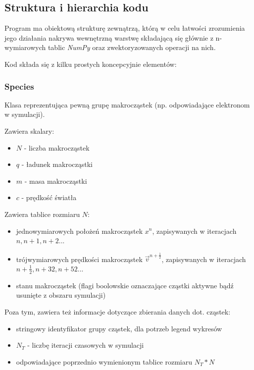 \subsection{Struktura i hierarchia kodu}

Program ma obiektową strukturę zewnątrzą, którą w celu łatwości zrozumienia jego działania nakrywa wewnętrzną warstwę
składającą się głównie z n-wymiarowych tablic \emph{NumPy} oraz zwektoryzowanych operacji na nich.

Kod składa się z kilku prostych koncepcyjnie elementów:

\subsubsection{Species}
Klasa reprezentująca pewną grupę makrocząstek (np. odpowiadające elektronom w symulacji).

Zawiera skalary:
\begin{itemize}
\item $N$ - liczba makrocząstek
\item $q$ - ładunek makrocząstki
\item $m$ - masa makrocząstki
\item $c$ - prędkość światła
\end{itemize}

Zawiera tablice rozmiaru $N$:
\begin{itemize}
\item jednowymiarowych położeń makrocząstek $x^n$, zapisywanych w iteracjach $n, n+1, n+2$...
\item trójwymiarowych prędkości makrocząstek $\vec{v}^{n+\frac{1}{2}}$, zapisywanych w iteracjach $n+\frac{1}{2}, n+{3}{2}, n+{5}{2}$...
\item stanu makrocząstek (flagi boolowskie oznaczające cząstki aktywne bądź usunięte z obszaru symulacji)
\end{itemize}

Poza tym, zawiera też informacje dotyczące zbierania danych dot. cząstek:
\begin{itemize}
    \item stringowy identyfikator grupy cząstek, dla potrzeb legend wykresów
    \item $N_T$ - liczbę iteracji czasowych w symulacji
    \item odpowiadające poprzednio wymienionym tablice rozmiaru $N_T * N$
\end{itemize}


